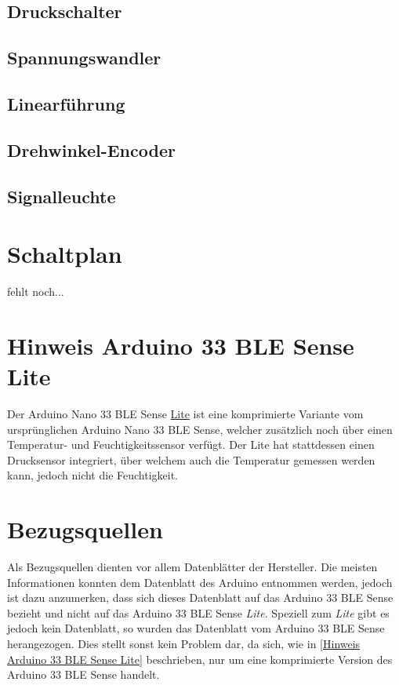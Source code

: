 \subsection{Druckschalter}
\subsection{Spannungswandler}
\subsection{Linearführung}
\subsection{Drehwinkel-Encoder}
\subsection{Signalleuchte}
\section{Schaltplan}
fehlt noch...


\section{Hinweis Arduino 33 BLE Sense Lite \label{Hinweis Arduino 33 BLE Sense Lite}}
Der Arduino Nano 33 BLE Sense \underline{Lite} ist eine komprimierte Variante vom ursprünglichen Arduino Nano 33 BLE Sense, welcher zusätzlich noch über einen Temperatur- und Feuchtigkeitssensor verfügt. Der Lite hat stattdessen einen Drucksensor integriert, über welchem auch die Temperatur gemessen werden kann, jedoch nicht die Feuchtigkeit.\cite{PetrFilipi.2022}
\section{Bezugsquellen}
Als Bezugsquellen dienten vor allem Datenblätter der Hersteller. Die meisten Informationen konnten dem Datenblatt des Arduino entnommen werden, jedoch ist dazu anzumerken, dass sich dieses Datenblatt auf das Arduino 33 BLE Sense bezieht und nicht auf das Arduino 33 BLE Sense \emph{Lite}. Speziell zum \emph{Lite} gibt es jedoch kein Datenblatt, so wurden das Datenblatt vom Arduino 33 BLE Sense herangezogen. Dies stellt sonst kein Problem dar, da sich, wie in \ref{Hinweis Arduino 33 BLE Sense Lite} beschrieben, nur um eine komprimierte Version des Arduino 33 BLE Sense handelt.


